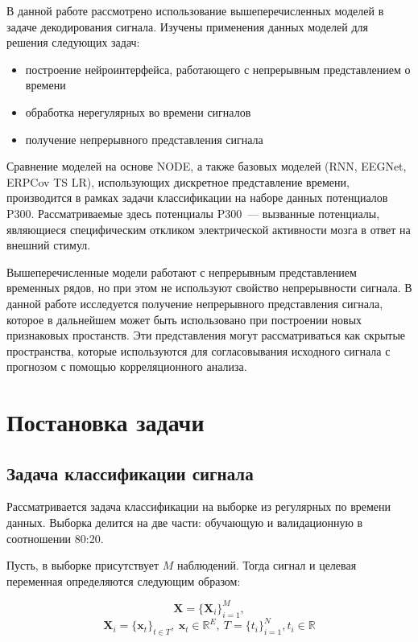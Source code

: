 \documentclass{article}
\newcommand{\x}{\mathbf{x}}
\newcommand{\X}{\mathbf{X}}
\newcommand{\R}{\mathbb{R}}
\begin{document}
В данной работе рассмотрено использование вышеперечисленных моделей в задаче декодирования сигнала. Изучены применения данных моделей для решения следующих задач:

\begin{itemize}
  \item построение нейроинтерфейса, работающего с непрерывным представлением о времени
  \item обработка нерегулярных во времени сигналов
  \item получение непрерывного представления сигнала
\end{itemize}

Сравнение моделей на основе NODE, а также базовых моделей (RNN, EEGNet\cite{Lawhern2018EEGNetAC}, ERPCov TS LR\cite{6046114}), использующих дискретное представление времени, производится в рамках задачи классификации на наборе данных потенциалов P300. Рассматриваемые здесь потенциалы P300~--- вызванные потенциалы, являющиеся специфическим откликом электрической активности мозга в ответ на внешний стимул.

Вышеперечисленные модели работают с непрерывным представлением временных рядов, но при этом не используют свойство непрерывности сигнала. В данной работе исследуется получение непрерывного представления сигнала, которое в дальнейшем может быть использовано при построении новых признаковых простанств. Эти представления могут рассматриваться как скрытые пространства, которые используются для согласовывания исходного сигнала с прогнозом с помощью корреляционного анализа.

\section{Постановка задачи}

\subsection{Задача классификации сигнала}
    
    Рассматривается задача классификации на выборке из регулярных по времени данных. Выборка делится на две части: обучающую и валидационную в соотношении 80:20.
    
    Пусть, в выборке присутствует $M$ наблюдений. Тогда сигнал и целевая переменная определяются следующим образом:
    

    $$\X = \{\X_i\}_{i=1}^{M},$$
    $$\X_i = \{\x_t\}_{t\in T}, \ \x_t \in \R^E, \ T = \{t_i\}_{i=1}^{N}, t_i \in \R$$ 
    
\end{document}
